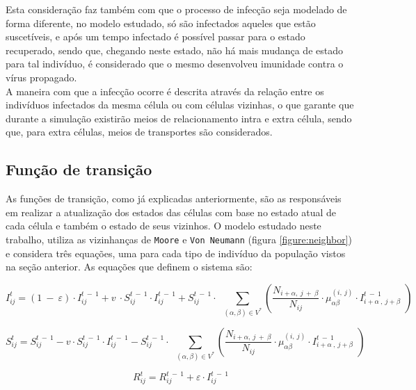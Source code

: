 \documentclass[a4paper,12pt]{article}
\begin{document}
Esta consideração faz também com que o processo de infecção seja modelado de forma diferente, no modelo estudado, só são infectados aqueles que estão suscetíveis, e após um tempo infectado é possível passar para o estado recuperado, sendo que, chegando neste estado, não há mais mudança de estado para tal indivíduo, é considerado que o mesmo desenvolveu imunidade contra o vírus propagado.\\

A maneira com que a infecção ocorre é descrita através da relação entre os indivíduos infectados da mesma célula ou com células vizinhas, o que garante que durante a simulação existirão meios de relacionamento intra e extra célula, sendo que, para extra células, meios de transportes são considerados.

\subsection{Função de transição}
As funções de transição, como já explicadas anteriormente, são as responsáveis em realizar a atualização dos estados das células com base no estado atual de cada célula e também o estado de seus vizinhos. O modelo estudado neste trabalho, utiliza as vizinhanças de \texttt{Moore} e \texttt{Von Neumann} (figura \ref{figure:neighbor}) e considera três equações, uma para cada tipo de indivíduo da população vistos na seção anterior. As equações que definem o sistema são:

\begin{equation} 
I_{ij}^t=\left(1\:-\:\varepsilon \right)\cdot I_{ij}^{t\:-\:1}+v\:\cdot S_{ij}^{t\:-\:1}\cdot I_{ij}^{t\:-\:1}+S_{ij}^{t\:-\:1}\cdot \:\displaystyle \:\sum _{\left(\alpha ,\beta \right)\in V^{\ast }}^{ }\left(\frac{N_{i+\alpha ,\:j\:+\:\beta }}{N_{ij}}\cdot \mu _{\alpha \beta }^{\left(i,\:j\right)}\cdot I_{i+\alpha \:,\:j+\beta \:}^{t\:-\:1}\:\right)
\label{eq1}
\end{equation}

\begin{equation}
S_{ij}^t=S_{ij}^{t\:-\:1}-v\cdot S_{ij}^{t\:-\:1}\cdot I_{ij}^{t\:-\:1}-S_{ij}^{t\:-\:1}\cdot \:\displaystyle \:\sum _{\left(\alpha ,\beta \right)\in V^{\ast }}^{ }\left(\frac{N_{i+\alpha ,\:j\:+\:\beta }}{N_{ij}}\cdot \mu _{\alpha \beta }^{\left(i,\:j\right)}\cdot I_{i+\alpha \:,\:j+\beta \:}^{t\:-\:1}\:\right)
\label{eq2}
\end{equation}

\begin{equation} 
R_{ij}^t=R_{ij}^{t\:-\:1}+\varepsilon \cdot I_{ij}^{t\:-\:1}
\label{eq3}
\end{equation}
\end{document}
